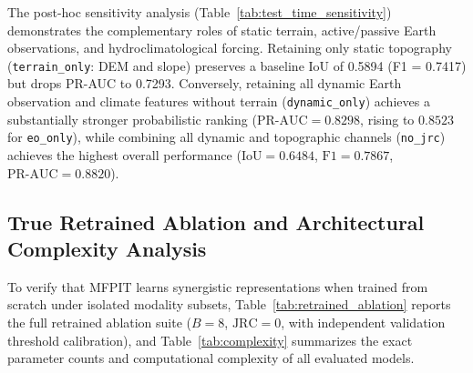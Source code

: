 \documentclass[preprint,12pt]{elsarticle}
\begin{document}
The post-hoc sensitivity analysis (Table~\ref{tab:test_time_sensitivity}) demonstrates the complementary roles of static terrain, active/passive Earth observations, and hydroclimatological forcing. Retaining only static topography (\texttt{terrain\_only}: DEM and slope) preserves a baseline IoU of 0.5894 (F1 = 0.7417) but drops PR-AUC to 0.7293. Conversely, retaining all dynamic Earth observation and climate features without terrain (\texttt{dynamic\_only}) achieves a substantially stronger probabilistic ranking ($\text{PR-AUC} = 0.8298$, rising to $0.8523$ for \texttt{eo\_only}), while combining all dynamic and topographic channels (\texttt{no\_jrc}) achieves the highest overall performance ($\text{IoU} = 0.6484$, $\text{F1} = 0.7867$, $\text{PR-AUC} = 0.8820$).

\subsection{True Retrained Ablation and Architectural Complexity Analysis}
To verify that MFPIT learns synergistic representations when trained from scratch under isolated modality subsets, Table~\ref{tab:retrained_ablation} reports the full retrained ablation suite ($B=8$, $\text{JRC}=0$, with independent validation threshold calibration), and Table~\ref{tab:complexity} summarizes the exact parameter counts and computational complexity of all evaluated models.

\begin{table}[htbp]
\caption{Retrained Ablation Study Results ($B=8, \text{JRC}=0$) with 95\% Block Bootstrap CIs ($1,000$ Replicates)}
\label{tab:retrained_ablation}
\centering
{}
\end{table}
\end{document}
